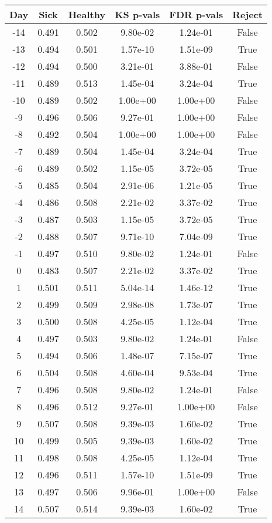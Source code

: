 \begin{tabular}{c|c|c|c|c|c}
Day &  Sick & Healthy &  KS p-vals & FDR p-vals & Reject\\
\hline
-14 & 0.491 &   0.502 &   9.80e-02 &   1.24e-01 &  False\\
-13 & 0.494 &   0.501 &   1.57e-10 &   1.51e-09 &   True\\
-12 & 0.494 &   0.500 &   3.21e-01 &   3.88e-01 &  False\\
-11 & 0.489 &   0.513 &   1.45e-04 &   3.24e-04 &   True\\
-10 & 0.489 &   0.502 &   1.00e+00 &   1.00e+00 &  False\\
 -9 & 0.496 &   0.506 &   9.27e-01 &   1.00e+00 &  False\\
 -8 & 0.492 &   0.504 &   1.00e+00 &   1.00e+00 &  False\\
 -7 & 0.489 &   0.504 &   1.45e-04 &   3.24e-04 &   True\\
 -6 & 0.489 &   0.502 &   1.15e-05 &   3.72e-05 &   True\\
 -5 & 0.485 &   0.504 &   2.91e-06 &   1.21e-05 &   True\\
 -4 & 0.486 &   0.508 &   2.21e-02 &   3.37e-02 &   True\\
 -3 & 0.487 &   0.503 &   1.15e-05 &   3.72e-05 &   True\\
 -2 & 0.488 &   0.507 &   9.71e-10 &   7.04e-09 &   True\\
 -1 & 0.497 &   0.510 &   9.80e-02 &   1.24e-01 &  False\\
  0 & 0.483 &   0.507 &   2.21e-02 &   3.37e-02 &   True\\
  1 & 0.501 &   0.511 &   5.04e-14 &   1.46e-12 &   True\\
  2 & 0.499 &   0.509 &   2.98e-08 &   1.73e-07 &   True\\
  3 & 0.500 &   0.508 &   4.25e-05 &   1.12e-04 &   True\\
  4 & 0.497 &   0.503 &   9.80e-02 &   1.24e-01 &  False\\
  5 & 0.494 &   0.506 &   1.48e-07 &   7.15e-07 &   True\\
  6 & 0.504 &   0.508 &   4.60e-04 &   9.53e-04 &   True\\
  7 & 0.496 &   0.508 &   9.80e-02 &   1.24e-01 &  False\\
  8 & 0.496 &   0.512 &   9.27e-01 &   1.00e+00 &  False\\
  9 & 0.507 &   0.508 &   9.39e-03 &   1.60e-02 &   True\\
 10 & 0.499 &   0.505 &   9.39e-03 &   1.60e-02 &   True\\
 11 & 0.498 &   0.508 &   4.25e-05 &   1.12e-04 &   True\\
 12 & 0.496 &   0.511 &   1.57e-10 &   1.51e-09 &   True\\
 13 & 0.497 &   0.506 &   9.96e-01 &   1.00e+00 &  False\\
 14 & 0.507 &   0.514 &   9.39e-03 &   1.60e-02 &   True\\
\end{tabular}